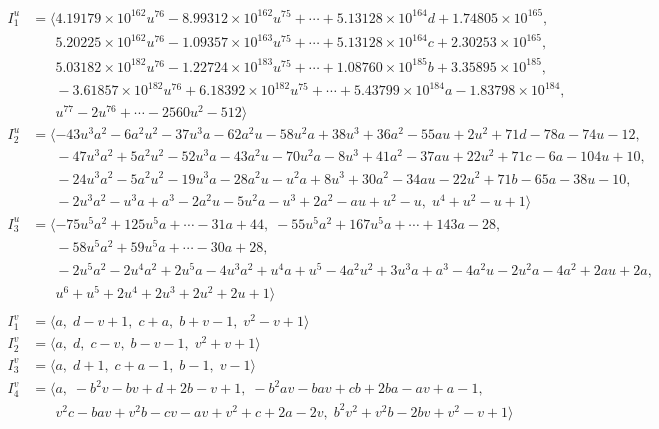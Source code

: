 \documentclass[1p]{elsarticle_modified}
\theoremstyle{definition}
\begin{document}
\begin{align*}
I^u_{1}&=\langle 
4.19179\times10^{162} u^{76}-8.99312\times10^{162} u^{75}+\cdots+5.13128\times10^{164} d+1.74805\times10^{165},\\
\phantom{I^u_{1}}&\phantom{= \langle  }5.20225\times10^{162} u^{76}-1.09357\times10^{163} u^{75}+\cdots+5.13128\times10^{164} c+2.30253\times10^{165},\\
\phantom{I^u_{1}}&\phantom{= \langle  }5.03182\times10^{182} u^{76}-1.22724\times10^{183} u^{75}+\cdots+1.08760\times10^{185} b+3.35895\times10^{185},\\
\phantom{I^u_{1}}&\phantom{= \langle  }-3.61857\times10^{182} u^{76}+6.18392\times10^{182} u^{75}+\cdots+5.43799\times10^{184} a-1.83798\times10^{184},\\
\phantom{I^u_{1}}&\phantom{= \langle  }u^{77}-2 u^{76}+\cdots-2560 u^2-512\rangle \\
I^u_{2}&=\langle 
-43 u^3 a^2-6 a^2 u^2-37 u^3 a-62 a^2 u-58 u^2 a+38 u^3+36 a^2-55 a u+2 u^2+71 d-78 a-74 u-12,\\
\phantom{I^u_{2}}&\phantom{= \langle  }-47 u^3 a^2+5 a^2 u^2-52 u^3 a-43 a^2 u-70 u^2 a-8 u^3+41 a^2-37 a u+22 u^2+71 c-6 a-104 u+10,\\
\phantom{I^u_{2}}&\phantom{= \langle  }-24 u^3 a^2-5 a^2 u^2-19 u^3 a-28 a^2 u- u^2 a+8 u^3+30 a^2-34 a u-22 u^2+71 b-65 a-38 u-10,\\
\phantom{I^u_{2}}&\phantom{= \langle  }-2 u^3 a^2- u^3 a+a^3-2 a^2 u-5 u^2 a- u^3+2 a^2- a u+u^2- u,\;u^4+u^2- u+1\rangle \\
I^u_{3}&=\langle 
-75 u^5 a^2+125 u^5 a+\cdots-31 a+44,\;-55 u^5 a^2+167 u^5 a+\cdots+143 a-28,\\
\phantom{I^u_{3}}&\phantom{= \langle  }-58 u^5 a^2+59 u^5 a+\cdots-30 a+28,\\
\phantom{I^u_{3}}&\phantom{= \langle  }-2 u^5 a^2-2 u^4 a^2+2 u^5 a-4 u^3 a^2+u^4 a+u^5-4 a^2 u^2+3 u^3 a+a^3-4 a^2 u-2 u^2 a-4 a^2+2 a u+2 a,\\
\phantom{I^u_{3}}&\phantom{= \langle  }u^6+u^5+2 u^4+2 u^3+2 u^2+2 u+1\rangle \\
\\
I^v_{1}&=\langle 
a,\;d- v+1,\;c+a,\;b+v-1,\;v^2- v+1\rangle \\
I^v_{2}&=\langle 
a,\;d,\;c- v,\;b- v-1,\;v^2+v+1\rangle \\
I^v_{3}&=\langle 
a,\;d+1,\;c+a-1,\;b-1,\;v-1\rangle \\
I^v_{4}&=\langle 
a,\;- b^2 v- b v+d+2 b- v+1,\;- b^2 a v- b a v+c b+2 b a- a v+a-1,\\
\phantom{I^v_{4}}&\phantom{= \langle  }v^2 c- b a v+v^2 b- c v- a v+v^2+c+2 a-2 v,\;b^2 v^2+v^2 b-2 b v+v^2- v+1\rangle \\
\end{align*}
\end{document}
